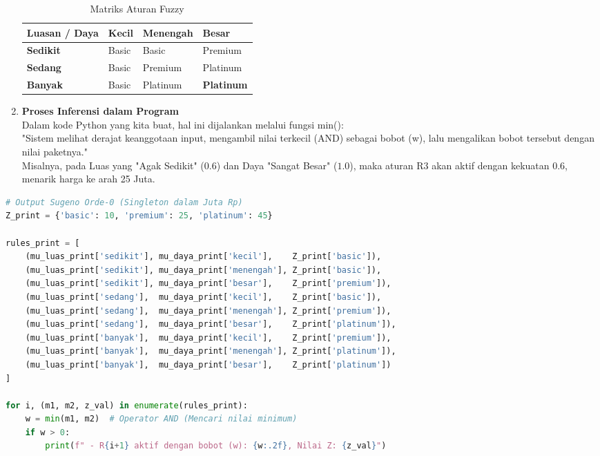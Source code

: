\documentclass{article}
\begin{document}
\begin{enumerate}
\begin{table}[h!]
\centering
\caption{Matriks Aturan Fuzzy}
\begin{tabular}{llll}
\hline
\textbf{Luasan / Daya} & \textbf{Kecil} & \textbf{Menengah} & \textbf{Besar}\\ \hline
\textbf{Sedikit}    & Basic     & Basic     & Premium     \\
\textbf{Sedang}     & Basic     & Premium   & Platinum     \\
\textbf{Banyak}     & Basic     & Platinum  & \textbf{Platinum}    \\ \hline
\end{tabular}
\label{tab:dummy_table} %
\end{table}
    
    \item \textbf{Proses Inferensi dalam Program}\\
Dalam kode Python yang kita buat, hal ini dijalankan melalui fungsi min(): \\
"Sistem melihat derajat keanggotaan input, mengambil nilai terkecil (AND) sebagai bobot (w), lalu mengalikan bobot tersebut dengan nilai paketnya."\\
Misalnya, pada Luas yang "Agak Sedikit" ($0.6$) dan Daya "Sangat Besar" ($1.0$), maka aturan R3 akan aktif dengan kekuatan $0.6$, menarik harga ke arah 25 Juta.

\end{enumerate}

\begin{lstlisting}[caption=Membuat Rule Output, language=Python]
# Output Sugeno Orde-0 (Singleton dalam Juta Rp)
Z_print = {'basic': 10, 'premium': 25, 'platinum': 45}

rules_print = [
    (mu_luas_print['sedikit'], mu_daya_print['kecil'],    Z_print['basic']),
    (mu_luas_print['sedikit'], mu_daya_print['menengah'], Z_print['basic']),
    (mu_luas_print['sedikit'], mu_daya_print['besar'],    Z_print['premium']),
    (mu_luas_print['sedang'],  mu_daya_print['kecil'],    Z_print['basic']),
    (mu_luas_print['sedang'],  mu_daya_print['menengah'], Z_print['premium']),
    (mu_luas_print['sedang'],  mu_daya_print['besar'],    Z_print['platinum']),
    (mu_luas_print['banyak'],  mu_daya_print['kecil'],    Z_print['premium']),
    (mu_luas_print['banyak'],  mu_daya_print['menengah'], Z_print['platinum']),
    (mu_luas_print['banyak'],  mu_daya_print['besar'],    Z_print['platinum'])
]

for i, (m1, m2, z_val) in enumerate(rules_print):
    w = min(m1, m2)  # Operator AND (Mencari nilai minimum)
    if w > 0:
        print(f" - R{i+1} aktif dengan bobot (w): {w:.2f}, Nilai Z: {z_val}")
\end{lstlisting} \\
\end{document}
